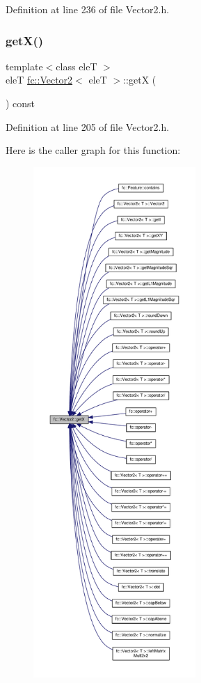 Definition at line 236 of file Vector2.\+h.

\mbox{\label{classfc_1_1Vector2_aa38816eb2546c75ebfa2d28771095583}} 
\subsubsection{\texorpdfstring{get\+X()}{getX()}}
{\footnotesize\ttfamily template$<$class eleT $>$ \\
eleT \hyperlink{classfc_1_1Vector2}{fc\+::\+Vector2}$<$ eleT $>$\+::getX (\begin{DoxyParamCaption}{ }\end{DoxyParamCaption}) const}



Definition at line 205 of file Vector2.\+h.

Here is the caller graph for this function\+:
\nopagebreak
\begin{figure}[H]
\begin{center}
\leavevmode
\includegraphics[height=550pt]{d9/d08/classfc_1_1Vector2_aa38816eb2546c75ebfa2d28771095583_icgraph}
\end{center}
\end{figure}
\mbox{\label{classfc_1_1Vector2_a4f9533a9e1a0dc8527f06e7531d238e5}} 
